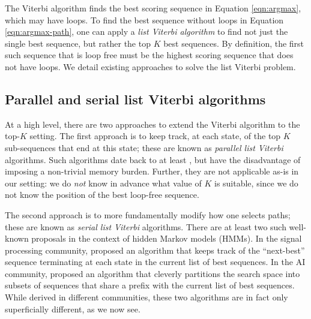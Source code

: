 

The Viterbi algorithm %
finds the best scoring sequence in Equation \ref{eqn:argmax}, which may have loops.
To find the best sequence without loops in Equation \ref{eqn:argmax-path}, one can apply a \emph{list Viterbi algorithm}
to find not just the single best sequence,
but rather the top $K$ best sequences.
By definition, the first such sequence that is loop free must be the highest scoring sequence that does not have loops.
We detail existing approaches to solve the list Viterbi problem.

%
\subsection{Parallel and serial list Viterbi algorithms}

At a high level, there are two approaches to extend the Viterbi algorithm to the top-$K$ setting.
The first approach is to keep track, at each state, of the top $K$ sub-sequences that end at this state; these are known as \emph{parallel list Viterbi} algorithms.
Such algorithms date back to at least \citet{Forney:1973},
but have the disadvantage of imposing a non-trivial memory burden.
Further, they are not applicable as-is in our setting:
we do \emph{not} know in advance what value of $K$ is suitable,
since we do not know the position of the best loop-free sequence.

The second approach is to more fundamentally modify how one selects paths; these are known as \emph{serial list Viterbi} algorithms.
There are at least two such well-known proposals in the context of hidden Markov models (HMMs).
In the signal processing community, \citet{seshadri1994list} proposed an algorithm that keeps track of the ``next-best'' sequence terminating at each state in the current list of best sequences.
In the AI community, \citet{nilsson2001sequentially}
proposed an algorithm that cleverly partitions the search space into subsets of sequences that share a prefix with the current list of best sequences.
While derived in different communities, these two algorithms are in fact only superficially different, as we now see.

